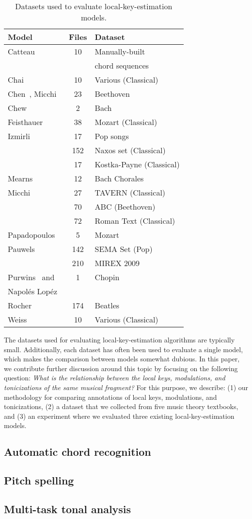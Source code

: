 \begin{table}
  \caption{Datasets used to evaluate local-key-estimation models.}
  \label{tab:corpus}
  \begin{tabular}{lcl}
    \toprule
    Model&Files&Dataset\\
    \midrule
    Catteau~\cite{Catteau07tonalkey} & 10 & Manually-built\\
    & & chord sequences\\
    Chai~\cite{chai_detection_2005} & 10 & Various (Classical)\\
    Chen~\cite{chen18harmony,chen19harmony}, Micchi~\cite{Micchi20:roman} & 23 & Beethoven\\
    Chew~\cite{chew2002key} & 2 & Bach\\
    Feisthauer~\cite{feisthauer2020smc} & 38 & Mozart (Classical) \\
    Izmirli~\cite{izmirli_localized_2007} & 17 & Pop songs\\
    & 152 & Naxos set (Classical)\\
    & 17 & Kostka-Payne (Classical)\\
    Mearns~\cite{mearns2011automatically} & 12 & Bach Chorales \\
    Micchi~\cite{Micchi20:roman} &  27 &  TAVERN (Classical)\\
    & 70 & ABC (Beethoven)\\
    & 72 & Roman Text (Classical)\\
    Papadopoulos~\cite{papadopoulos_local_2009} & 5 & Mozart\\
    Pauwels~\cite{pauwels_combining_2014} & 142 & SEMA Set (Pop)\\
    & 210 & MIREX 2009\\
    Purwins~\cite{purwins_new_2000} and & 1 & Chopin\\
    Napol\'{e}s Lop\'{e}z~\cite{napoleslopez2019key} & & \\
    Rocher~\cite{thomas_rocher_2010_1417485} & 174 & Beatles\\
    Weiss~\cite{weiss2014chroma} & 10 & Various (Classical) \\
  \bottomrule
\end{tabular}
\end{table}

The datasets used for evaluating local-key-estimation algorithms are typically small.
Additionally, each dataset has often been used to evaluate a single model, which makes the comparison between models somewhat dubious.
In this paper, we contribute further discussion around this topic by focusing on the following question: \emph{What is the relationship between the local keys, modulations, and tonicizations of the same musical fragment?}
For this purpose, we describe: (1) our methodology for comparing annotations of local keys, modulations, and tonicizations, (2) a dataset that we collected from five music theory textbooks, and (3) an experiment where we evaluated three existing local-key-estimation models.

\subsection{Automatic chord recognition}
\subsection{Pitch spelling}
\subsection{Multi-task tonal analysis}
